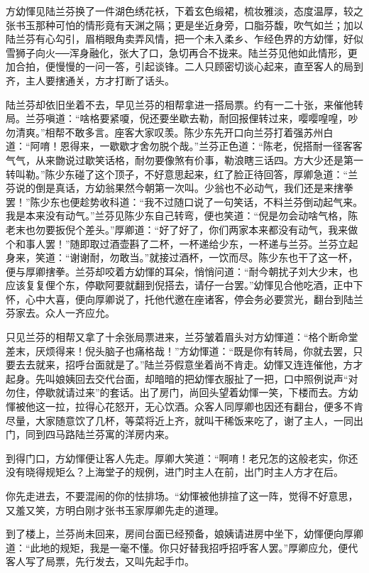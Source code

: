 \documentclass[12pt,UTF8]{ctexbook}
\begin{document}
{{{方幼惲见陆兰芬换了一件湖色绣花袄，下着玄色缎裙，梳妆雅淡，态度温厚，较之张书玉那种可怕的情形竟有天渊之隔；更是坐近身旁，口脂芬馥，吹气如兰；加以陆兰芬有心勾引，眉梢眼角卖弄风情，把一个未入柔乡、乍经色界的方幼惲，好似雪狮子向火──浑身融化，张大了口，急切再合不拢来。陆兰芬见他如此情形，更加合拍，便慢慢的一问一答，引起谈锋。二人只顾密切谈心起来，直至客人的局到齐，主人要搳通关，方才打断了话头。

陆兰芬却依旧坐着不去，早见兰芬的相帮拿进一搭局票。约有一二十张，来催他转局。兰芬嗔道：“啥格要紧嗄，倪还要坐歇去勒，耐回报俚转过来，嘤嘤喤喤，吵勿清爽。”相帮不敢多言。座客大家叹羡。陈少东先开口向兰芬打着强苏州白道：“阿唷！恩得来，一歇歇才舍勿脱个哉。”兰芬正色道：“陈老，倪搭耐一径客客气气，从来朆说过歇笑话格，耐勿要像煞有价事，勒浪瞎三话四。方大少还是第一转叫勒。”陈少东碰了这个顶子，不好意思起来，红了脸正待回答，厚卿急道：“兰芬说的倒是真话，方幼翁果然今朝第一次叫。少翁也不必动气，我们还是来搳拳罢！”陈少东也便趁势收科道：“我不过随口说了一句笑话，不料兰芬倒动起气来。我是本来没有动气。”兰芬见陈少东自己转弯，便也笑道：“倪是勿会动啥气格，陈老末也勿要扳倪个差头。”厚卿道：“好了好了，你们两家本来都没有动气，我来做个和事人罢！”随即取过酒壶斟了二杯，一杯递给少东，一杯递与兰芬。兰芬立起身来，笑道：“谢谢耐，勿敢当。”就接过酒杯，一饮而尽。陈少东也干了这一杯，便与厚卿搳拳。兰芬却咬着方幼惲的耳朵，悄悄问道：“耐今朝扰子刘大少末，也应该复复俚个东，停歇阿要就翻到倪搭去，请仔一台罢。”幼惲见合他吃酒，正中下怀，心中大喜，便向厚卿说了，托他代邀在座诸客，停会务必要赏光，翻台到陆兰芬家去。众人一齐应允。

只见兰芬的相帮又拿了十余张局票进来，兰芬皱着眉头对方幼惲道：“格个断命堂差末，厌烦得来！倪头脑子也痛格哉！”方幼惲道：“既是你有转局，你就去罢，只要去去就来，招呼台面就是了。”陆兰芬假意坐着尚不肯走。幼惲又连连催他，方才起身。先叫娘姨回去交代台面，却暗暗的把幼惲衣服扯了一把，口中照例说声“对勿住，停歇就请过来”的套话。出了房门，尚回头望着幼惲一笑，下楼而去。方幼惲被他这一拉，拉得心花怒开，无心饮酒。众客人同厚卿也因还有翻台，便多不肯尽量，大家随意饮了几杯，等菜将近上齐，就叫干稀饭来吃了，谢了主人，一同出门，同到四马路陆兰芬寓的洋房内来。

到得门口，方幼惲便让客人先走。厚卿大笑道：“啊唷！老兄怎的这般老实，你还没有晓得规矩么？上海堂子的规例，进门时主人在前，出门时主人方才在后。

你先走进去，不要混闹的你的怯排场。“幼惲被他排揎了这一阵，觉得不好意思，又羞又笑，方明白刚才张书玉家厚卿先走的道理。

到了楼上，兰芬尚未回来，房间台面已经预备，娘姨请进房中坐下，幼惲便向厚卿道：“此地的规矩，我是一毫不懂。你只好替我招呼招呼客人罢。”厚卿应允，便代客人写了局票，先行发去，又叫先起手巾。

}}}
\end{document}
